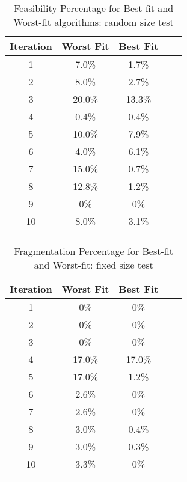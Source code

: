 \begin{table}[htbp]
    \centering
    \caption{Feasibility Percentage for Best-fit and Worst-fit algorithms: random size test}
    \begin{tabular}{@{}ccccc@{}}
    \toprule
    \textbf{Iteration} & \textbf{Worst Fit} & \textbf{Best Fit} \\ \midrule
    1 & 7.0\% & 1.7\% \\
    2 & 8.0\% & 2.7\% \\
    3 & 20.0\% & 13.3\% \\
    4 & 0.4\% & 0.4\% \\
    5 & 10.0\% & 7.9\% \\
    6 & 4.0\% & 6.1\% \\
    7 & 15.0\% & 0.7\% \\
    8 & 12.8\% & 1.2\% \\
    9 & 0\% & 0\% \\
    10 & 8.0\% & 3.1\% \\ \bottomrule
    \label{tab:random test}
    \end{tabular}
\end{table}


\begin{table}[htbp]
    \centering
    \caption{Fragmentation Percentage for Best-fit and Worst-fit: fixed size test}
    \begin{tabular}{@{}ccccc@{}}
    \toprule
    \textbf{Iteration} & \textbf{Worst Fit} & \textbf{Best Fit} \\ \midrule
    1 & 0\% & 0\% \\
    2 & 0\% & 0\% \\
    3 & 0\% & 0\% \\
    4 & 17.0\% & 17.0\% \\
    5 & 17.0\% & 1.2\% \\
    6 & 2.6\% & 0\% \\
    7 & 2.6\% & 0\% \\
    8 & 3.0\% & 0.4\% \\
    9 & 3.0\% & 0.3\% \\
    10 & 3.3\% & 0\% \\ \bottomrule
    \label{tab:fixed test}
\end{tabular}
\end{table}